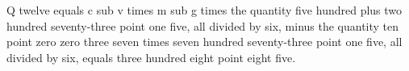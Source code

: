 Q twelve equals c sub v times m sub g times the quantity five hundred plus two hundred seventy-three point one five, all divided by six, minus the quantity ten point zero zero three seven times seven hundred seventy-three point one five, all divided by six, equals three hundred eight point eight five.